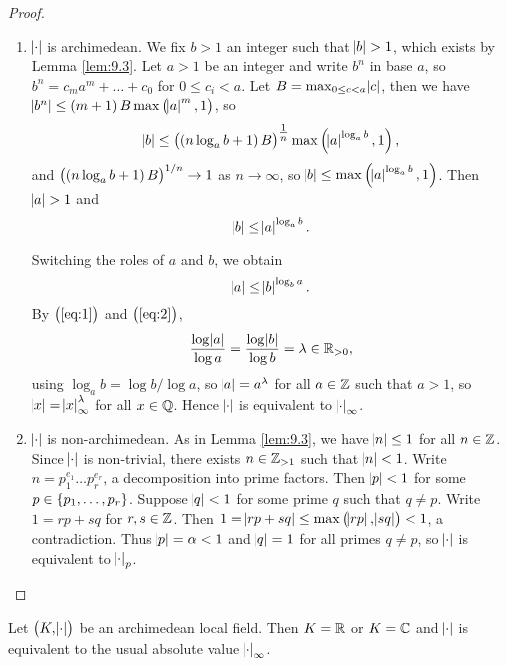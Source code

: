 \begin{proof}
\hfill
\begin{enumerate}[leftmargin=0.5in, label=Case \arabic*.]
\item $ \abs{\cdot} $ is archimedean. We fix $ b > 1 $ an integer such that $ \abs{b} > 1 $, which exists by Lemma \ref{lem:9.3}. Let $ a > 1 $ be an integer and write $ b^n $ in base $ a $, so $ b^n = c_ma^m + \dots + c_0 $ for $ 0 \le c_i < a $. Let $ B = \max_{0 \le c < a} \abs{c} $, then we have $ \abs{b^n} \le \br{m + 1}B\max\br{\abs{a}^m, 1} $, so
$$ \abs{b} \le \br{\br{n\log_a b + 1}B}^{\tfrac{1}{n}}\max\br{\abs{a}^{\log_a b}, 1}, $$
and $ \br{\br{n\log_a b + 1}B}^{1 / n} \to 1 $ as $ n \to \infty $, so $ \abs{b} \le \max\br{\abs{a}^{\log_a b}, 1} $. Then $ \abs{a} > 1 $ and
\begin{equation}
\label{eq:1}
\abs{b} \le \abs{a}^{\log_a b}.
\end{equation}

\pagebreak

Switching the roles of $ a $ and $ b $, we obtain
\begin{equation}
\label{eq:2}
\abs{a} \le \abs{b}^{\log_b a}.
\end{equation}
By $ \br{\ref{eq:1}} $ and $ \br{\ref{eq:2}} $,
$$ \dfrac{\log \abs{a}}{\log a} = \dfrac{\log \abs{b}}{\log b} = \lambda \in \mathbb{R}_{> 0}, $$
using $ \log_a b = \log b / \log a $, so $ \abs{a} = a^\lambda $ for all $ a \in \mathbb{Z} $ such that $ a > 1 $, so $ \abs{x} = \abs{x}_\infty^\lambda $ for all $ x \in \mathbb{Q} $. Hence $ \abs{\cdot} $ is equivalent to $ \abs{\cdot}_\infty $.
\item $ \abs{\cdot} $ is non-archimedean. As in Lemma \ref{lem:9.3}, we have $ \abs{n} \le 1 $ for all $ n \in \mathbb{Z} $. Since $ \abs{\cdot} $ is non-trivial, there exists $ n \in \mathbb{Z}_{> 1} $ such that $ \abs{n} < 1 $. Write $ n = p_1^{e_1} \dots p_r^{e_r} $, a decomposition into prime factors. Then $ \abs{p} < 1 $ for some $ p \in \cbr{p_1, \dots, p_r} $. Suppose $ \abs{q} < 1 $ for some prime $ q $ such that $ q \ne p $. Write $ 1 = rp + sq $ for $ r, s \in \mathbb{Z} $. Then $ 1 = \abs{rp + sq} \le \max\br{\abs{rp}, \abs{sq}} < 1 $, a contradiction. Thus $ \abs{p} = \alpha < 1 $ and $ \abs{q} = 1 $ for all primes $ q \ne p $, so $ \abs{\cdot} $ is equivalent to $ \abs{\cdot}_p $.
\end{enumerate}
\end{proof}

\begin{theorem}
\label{thm:9.6}
Let $ \br{K, \abs{\cdot}} $ be an archimedean local field. Then $ K = \mathbb{R} $ or $ K = \mathbb{C} $ and $ \abs{\cdot} $ is equivalent to the usual absolute value $ \abs{\cdot}_\infty $.
\end{theorem}

